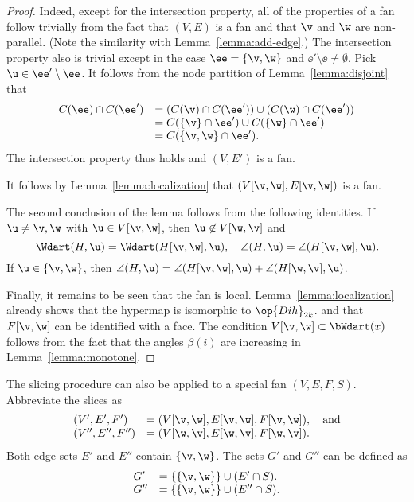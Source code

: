 \begin{proof} 
Indeed, except for the intersection property, all of the properties
of a fan follow trivially from the fact that $(V,E)$ is a fan and
that $\v$ and $\w$ are non-parallel.  (Note the similarity with
Lemma~\ref{lemma:add-edge}.)  The intersection property also is
trivial except in the case $\ee=\{\v,\w\}$ and $\ee'\setminus \ee\ne
\emptyset$.  Pick $\u\in \ee'\setminus\ee$.  It follows from the
node partition of Lemma~\ref{lemma:disjoint} that
\begin{displaymath}
\begin{array}{lll}
C(\ee) \cap C(\ee') &= (C(\v) \cap C(\ee')) \cup (C(\w)\cap C(\ee')) \\
&= C(\{\v\}\cap \ee') \cup C(\{\w\}\cap \ee') \\
&= C(\{\v,\w\}\cap \ee').
\end{array}
\end{displaymath}
The intersection property thus holds and $(V,E')$ is a fan.

It follows by Lemma~\ref{lemma:localization} that
$(V[\v,\w],E[\v,\w])$ is a fan.

The second conclusion of the lemma follows from the following identities.
If $\u\ne \v,\w$ with $\u\in V[\v,\w]$, then $\u\not\in V[\w,\v]$ and 
\begin{equation}
\Wdart(H,\u)=\Wdart(H[\v,\w],\u),\quad \angle(H,\u) = \angle(H[\v,\w],\u).
\end{equation}
If $\u\in\{\v,\w\}$, then 
$\angle(H,\u)=\angle(H[\v,\w],\u) +\angle(H[\w,\v],\u)$.

Finally, it remains to be seen that the fan is local.
Lemma~\ref{lemma:localization} already shows that the hypermap is
isomorphic to $\op{Dih}_{2k}$. and that $F[\v,\w]$ can be identified with a
face.  The condition $V[\v,\w]\subset \bWdart(x)$ follows from the
fact that the angles $\beta(i)$ are increasing in
Lemma~\ref{lemma:monotone}.
\end{proof}



The slicing procedure can also be applied to a special fan $(V,E,F,S)$.
Abbreviate the slices as
\begin{displaymath}
\begin{array}{lll}
(V',E',F')&=(V[\v,\w],E[\v,\w],F[\v,\w]),\quad\text{and}\\
(V'',E'',F'')&= (V[\w,\v],E[\w,\v],F[\w,\v]).
\end{array}
\end{displaymath}
Both edge sets $E'$ and $E''$ contain $\{\v,\w\}$.  The sets $G'$ and
$G''$ can be defined as
\begin{displaymath}
\begin{array}{lll}
G' &= \{\{\v,\w\}\} \cup (E'\cap S).\\
G'' &= \{\{\v,\w\}\} \cup (E''\cap S).\\
\end{array}
\end{displaymath} 

